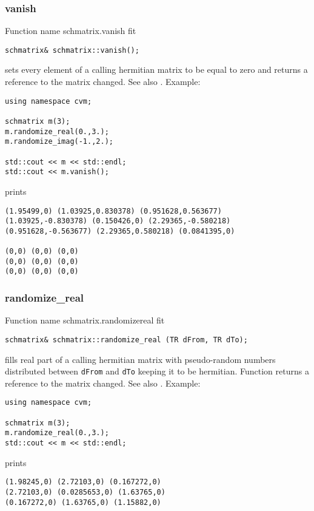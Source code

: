 \subsubsection{vanish}
Function%
\pdfdest name {schmatrix.vanish} fit
\begin{verbatim}
schmatrix& schmatrix::vanish();
\end{verbatim}
sets every element of a calling hermitian 
matrix to be equal to zero
and returns a reference to
the matrix changed.
See also .
Example:
\begin{Verbatim}
using namespace cvm;

schmatrix m(3);
m.randomize_real(0.,3.);
m.randomize_imag(-1.,2.);

std::cout << m << std::endl;
std::cout << m.vanish();
\end{Verbatim}
prints
\begin{Verbatim}
(1.95499,0) (1.03925,0.830378) (0.951628,0.563677)
(1.03925,-0.830378) (0.150426,0) (2.29365,-0.580218)
(0.951628,-0.563677) (2.29365,0.580218) (0.0841395,0)

(0,0) (0,0) (0,0)
(0,0) (0,0) (0,0)
(0,0) (0,0) (0,0)
\end{Verbatim}
\newpage



\subsubsection{randomize\_real}
Function%
\pdfdest name {schmatrix.randomizereal} fit
\begin{verbatim}
schmatrix& schmatrix::randomize_real (TR dFrom, TR dTo);
\end{verbatim}
fills  real part of a calling hermitian matrix with 
pseudo-random numbers distributed between
\verb"dFrom" and \verb"dTo" keeping it to be hermitian.
Function
returns a reference to the matrix changed.
See also
.
Example:
\begin{Verbatim}
using namespace cvm;

schmatrix m(3);
m.randomize_real(0.,3.);
std::cout << m << std::endl;
\end{Verbatim}
prints
\begin{Verbatim}
(1.98245,0) (2.72103,0) (0.167272,0)
(2.72103,0) (0.0285653,0) (1.63765,0)
(0.167272,0) (1.63765,0) (1.15882,0)
\end{Verbatim}
\newpage


